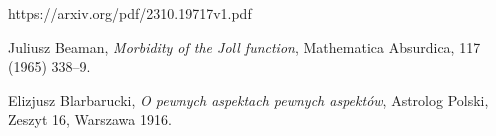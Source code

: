 
\begin{thebibliography}{99}

	\bibitem[]{} https://arxiv.org/pdf/2310.19717v1.pdf

	 Juliusz Beaman, \textit{Morbidity of the Joll function}, Mathematica Absurdica, 117 (1965) 338--9.

	 Elizjusz Blarbarucki, \textit{O pewnych
		aspektach pewnych aspektów}, Astrolog Polski, Zeszyt 16, Warszawa
	1916.

\end{thebibliography}

